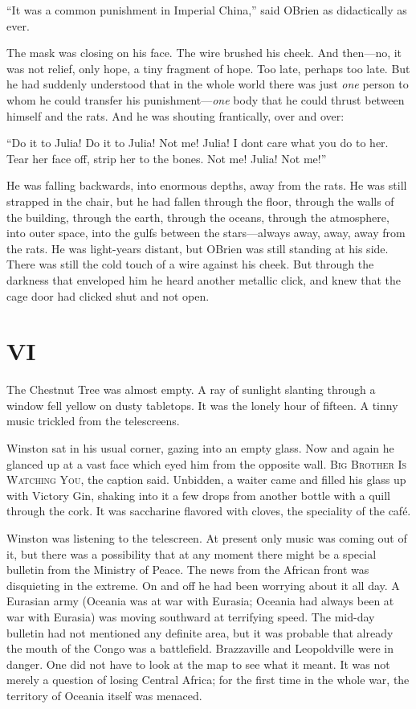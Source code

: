 ``It was a common punishment in Imperial China,'' said
O\textquotesingle Brien as didactically as ever.

The mask was closing on his face. The wire brushed his cheek. And
then---no, it was not relief, only hope, a tiny fragment of hope. Too
late, perhaps too late. But he had suddenly understood that in the whole
world there was just \emph{one} person to whom he could transfer his
punishment---\emph{one} body that he could thrust between himself and
the rats. And he was shouting frantically, over and over:

``Do it to Julia! Do it to Julia! Not me! Julia! I don\textquotesingle t
care what you do to her. Tear her face off, strip her to the bones. Not
me! Julia! Not me!''

He was falling backwards, into enormous depths, away from the rats. He
was still strapped in the chair, but he had fallen through the floor,
through the walls of the building, through the earth, through the
oceans, through the atmosphere, into outer space, into the gulfs between
the stars---always away, away, away from the rats. He was light-years
distant, but O\textquotesingle Brien was still standing at his side.
There was still the cold touch of a wire against his cheek. But through
the darkness that enveloped him he heard another metallic click, and
knew that the cage door had clicked shut and not open.


\section{VI}\label{vi-2}

The Chestnut Tree was almost empty. A ray of sunlight slanting through a
window fell yellow on dusty tabletops. It was the lonely hour of
fifteen. A tinny music trickled from the telescreens.

Winston sat in his usual corner, gazing into an empty glass. Now and
again he glanced up at a vast face which eyed him from the opposite
wall. \textsc{Big Brother Is Watching You}, the caption said. Unbidden, a
waiter came and filled his glass up with Victory Gin, shaking into it a
few drops from another bottle with a quill through the cork. It was
saccharine flavored with cloves, the speciality of the café.

Winston was listening to the telescreen. At present only music was
coming out of it, but there was a possibility that at any moment there
might be a special bulletin from the Ministry of Peace. The news from
the African front was disquieting in the extreme. On and off he had been
worrying about it all day. A Eurasian army (Oceania was at war with
Eurasia; Oceania had always been at war with Eurasia) was moving
southward at terrifying speed. The mid-day bulletin had not mentioned
any definite area, but it was probable that already the mouth of the
Congo was a battlefield. Brazzaville and Leopoldville were in danger.
One did not have to look at the map to see what it meant. It was not
merely a question of losing Central Africa; for the first time in the
whole war, the territory of Oceania itself was menaced.

